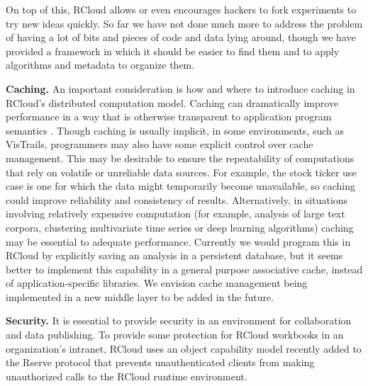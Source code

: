 On top of this, RCloud allows or even encourages hackers to fork experiments
to try new ideas quickly. So far we have not done much more to address the
problem of having a lot of bits and pieces of code and data lying around,
though we have provided a framework in which it should be easier to find them
and to apply algorithms and metadata to organize them.


{\bf Caching.}
An important consideration is how and where to introduce caching
in RCloud's distributed computation model. Caching can dramatically
improve performance in a way that is otherwise transparent to
application program semantics \cite{Callahan:2006:VVM, Guo:2010:TPI}.
Though caching is usually implicit, in some environments, such as
VisTrails, programmers may also have some explicit control over cache
management. This may be desirable to ensure the repeatability of
computations that rely on volatile or unreliable data sources.
For example, the stock ticker use case is one for which the data
might temporarily become unavailable, so caching could improve
reliability and consistency of results. Alternatively, in situations
involving relatively expensive computation (for example, analysis of large
text corpora, clustering multivariate time series or deep learning algorithms)
caching may be essential to adequate performance. Currently we would
program this in RCloud by explicitly saving an analysis in a persistent database,
but it seems better to implement this capability in a general purpose associative
cache, instead of application-specific libraries. We envision cache management
being implemented in a new middle layer to be added in the future.

{\bf Security.}
It is essential to provide security in an environment for
collaboration and data publishing. To provide some
protection for RCloud workbooks in an organization's intranet,
RCloud uses an object capability model
\cite{Miller:2006:RCT}
recently added to the Rserve protocol \cite{Urbanek:2003:AFW}
that prevents unauthenticated clients from making
unauthorized calls to the RCloud runtime environment.

